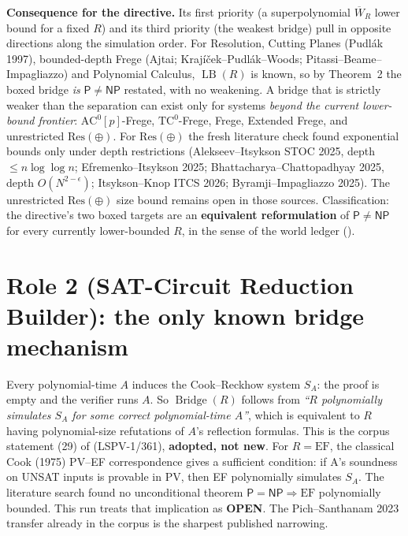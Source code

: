\documentclass[11pt]{article}
\newcommand{\Wbar}{\overline W}
\begin{document}
\textbf{Consequence for the directive.} Its first priority (a superpolynomial
$\Wbar_R$ lower bound for a fixed $R$) and its third priority (the weakest
bridge) pull in opposite directions along the simulation order. For
Resolution, Cutting Planes (Pudlák 1997), bounded-depth Frege
(Ajtai; Krajíček--Pudlák--Woods; Pitassi--Beame--Impagliazzo) and Polynomial
Calculus, $\operatorname{LB}(R)$ is known, so by Theorem~2 the boxed bridge
\emph{is} $\mathsf P\neq\mathsf{NP}$ restated, with no weakening. A bridge that
is strictly weaker than the separation can exist only for systems
\emph{beyond the current lower-bound frontier}: $\mathrm{AC}^0[p]$-Frege,
$\mathrm{TC}^0$-Frege, Frege, Extended Frege, and unrestricted
$\mathrm{Res}(\oplus)$. For $\mathrm{Res}(\oplus)$ the fresh literature check
found exponential bounds only under depth restrictions
(Alekseev--Itsykson STOC 2025, depth $\le n\log\log n$; Efremenko--Itsykson
2025; Bhattacharya--Chattopadhyay 2025, depth $O(N^{2-\epsilon})$;
Itsykson--Knop ITCS 2026; Byramji--Impagliazzo 2025). The unrestricted
$\mathrm{Res}(\oplus)$ size bound remains open in those sources.
Classification: the directive's two boxed targets are an
\textbf{equivalent reformulation} of $\mathsf P\neq\mathsf{NP}$ for every
currently lower-bounded $R$, in the sense of the world ledger
().

\section{Role 2 (SAT-Circuit Reduction Builder): the only known bridge mechanism}
Every polynomial-time $A$ induces the Cook--Reckhow system $S_A$: the proof is
empty and the verifier runs $A$. So $\operatorname{Bridge}(R)$ follows from
\emph{``$R$ polynomially simulates $S_A$ for some correct polynomial-time $A$''},
which is equivalent to $R$ having polynomial-size refutations of $A$'s
reflection formulas. This is the corpus statement (29) of
(LSPV-1/361), \textbf{adopted, not new}. For $R=\mathrm{EF}$, the classical
Cook (1975) PV--EF correspondence gives a sufficient condition: if A's
soundness on UNSAT inputs is provable in PV, then EF polynomially simulates $S_A$.
The literature search found no unconditional theorem
$\mathsf P=\mathsf{NP}\Rightarrow\mathrm{EF}$ polynomially bounded. This run
treats that implication as \textbf{OPEN}. The Pich--Santhanam 2023 transfer
already in the corpus is the sharpest published narrowing.
\end{document}
